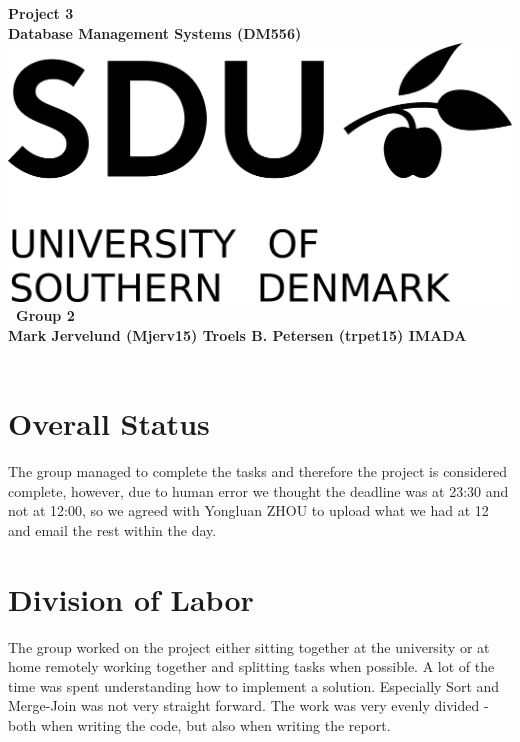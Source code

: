 \documentclass[a4paper,10pt,titlepage]{report}
\date{}
\begin{document}
\begin{titlepage}
\centering
    \vspace*{9\baselineskip}
    \huge
    \bfseries
    Project 3\\
    
    \normalfont 
	\huge    
    Database Management Systems (DM556)  \\[4\baselineskip]
    \normalfont
	\includegraphics[scale=1.5]{SDU_Logo}
    \vfill\
    Group 2\\
    Mark Jervelund (Mjerv15)    Troels B. Petersen (trpet15)
    \vspace{5mm}
    IMADA \\
    \textbf{\datedate} \\[2\baselineskip]
\end{titlepage}

\setcounter{page}{1}
\renewcommand{\thepage}{\arabic{page}}

\lstset{language=Java}          %
\section{Overall Status}
The group managed to complete the tasks and therefore the project is considered complete, however, due to human error we thought the deadline was at 23:30 and not at 12:00, so we agreed with Yongluan ZHOU to upload what we had at 12 and email the rest within the day.
\section{Division of Labor}
The group worked on the project either sitting together at the university or at home remotely working together and splitting tasks when possible. A lot of the time was spent understanding how to implement a solution. Especially Sort and Merge-Join was not very straight forward. The work was very evenly divided - both when writing the code, but also when writing the report.
\end{document}
